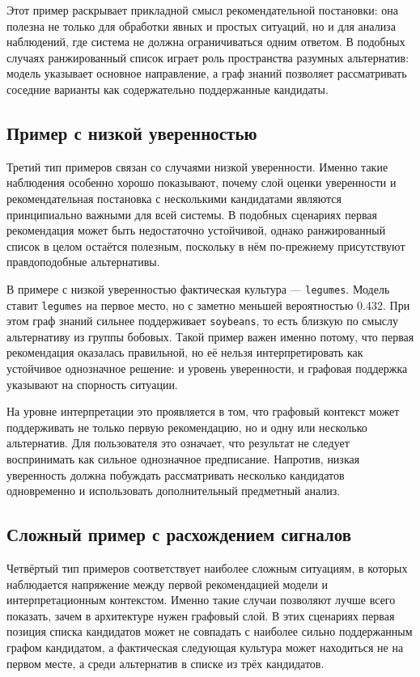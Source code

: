 Этот пример раскрывает прикладной смысл рекомендательной постановки: она полезна не только для обработки явных и простых
ситуаций, но и для анализа наблюдений, где система не должна ограничиваться одним ответом. В подобных случаях ранжированный список играет роль пространства разумных альтернатив: модель указывает
основное направление, а граф знаний позволяет рассматривать соседние варианты как содержательно поддержанные кандидаты.

\subsection{Пример с низкой уверенностью}

Третий тип примеров связан со случаями низкой уверенности. Именно такие наблюдения особенно хорошо показывают, почему
слой оценки уверенности и рекомендательная постановка с несколькими кандидатами являются принципиально важными для всей
системы. В подобных сценариях первая рекомендация может быть недостаточно устойчивой, однако ранжированный список в
целом остаётся полезным, поскольку в нём по-прежнему присутствуют правдоподобные альтернативы.

В примере с низкой уверенностью фактическая культура --- \texttt{legumes}. Модель ставит \texttt{legumes} на первое
место, но с заметно меньшей вероятностью 0.432. При этом граф знаний сильнее поддерживает \texttt{soybeans}, то есть
близкую по смыслу альтернативу из группы бобовых. Такой пример важен именно потому, что первая рекомендация оказалась
правильной, но её нельзя интерпретировать как устойчивое однозначное решение: и уровень уверенности, и графовая
поддержка указывают на спорность ситуации.

На уровне интерпретации это проявляется в том, что графовый контекст может поддерживать не только первую рекомендацию,
но и одну или несколько альтернатив. Для пользователя это означает, что результат не следует воспринимать как сильное
однозначное предписание. Напротив, низкая уверенность должна побуждать рассматривать несколько кандидатов одновременно и
использовать дополнительный предметный анализ.

\subsection{Сложный пример с расхождением сигналов}

Четвёртый тип примеров соответствует наиболее сложным ситуациям, в которых наблюдается напряжение между первой
рекомендацией модели и интерпретационным контекстом. Именно такие случаи позволяют лучше всего показать, зачем в
архитектуре нужен графовый слой. В этих сценариях первая позиция списка кандидатов может не совпадать с наиболее сильно
поддержанным графом кандидатом, а фактическая следующая культура может находиться не на первом месте, а среди
альтернатив в списке из трёх кандидатов.

